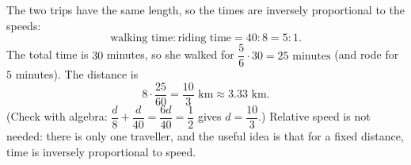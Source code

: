 The two trips have the same length, so the times are inversely proportional to the speeds:
\[\text{walking time}:\text{riding time}=40:8=5:1.\]
The total time is $30$ minutes, so she walked for $\dfrac56\cdot30=\boxed{25\text{ minutes}}$ (and rode for $5$ minutes). The distance is
\[8\cdot\dfrac{25}{60}=\boxed{\dfrac{10}{3}\text{ km}}\approx3.33\text{ km}.\]
(Check with algebra: $\dfrac d8+\dfrac{d}{40}=\dfrac{6d}{40}=\dfrac12$ gives $d=\dfrac{10}{3}$.) Relative speed is not needed: there is only one traveller, and the useful idea is that for a fixed distance, time is inversely proportional to speed.
